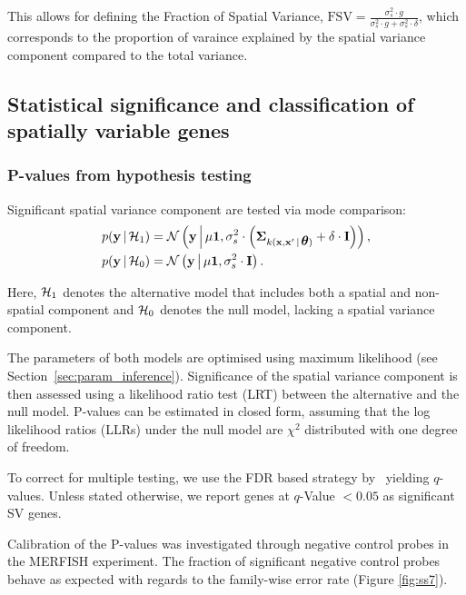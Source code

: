 This allows for defining the Fraction of Spatial Variance, $ \text{FSV} = \frac{\sigma^2_s \cdot g}{\sigma^2_s \cdot g + \sigma^2_s \cdot \delta} $, which corresponds to the proportion of varaince explained by the spatial variance component compared to the total variance.

\subsection{Statistical significance and classification of spatially variable genes}

\subsubsection*{P-values from hypothesis testing}

Significant spatial variance component are tested via mode comparison: 
\begin{align*}
    p({\bf y} \,|\, \mathcal{H}_1) &=  \mathcal{N}\left({\bf y} \,\middle | \, \mu {\bf 1}, \sigma_s^2 \cdot \left ( \mbox{\boldmath $\Sigma$}_{k({\bf x},{\bf x}'\,|\, \mbox{\boldmath $\theta$})} + \delta \cdot {\bf I} \right )\right), \\
    p({\bf y} \,|\, \mathcal{H}_0) &=  \mathcal{N}\left({\bf y} \,\middle | \, \mu {\bf 1},  \sigma_s^2 \cdot {\bf I}\right).
\end{align*}

Here, $\mathcal{H}_1$ denotes the alternative model that includes both a spatial and non-spatial component and $\mathcal{H}_0$ denotes the null model, lacking a spatial variance component.

The parameters of both models are optimised using maximum likelihood (see Section~\ref{sec:param_inference}).
Significance of the spatial variance component is then assessed using a likelihood ratio test (LRT) between the alternative and the null model. 
P-values can be estimated in closed form, assuming that the log likelihood ratios (LLRs) under the null model are \( \chi^2 \) distributed with one degree of freedom.

\begin{sloppypar}
To correct for multiple testing, we use the FDR based strategy by~\cite{Storey2003-ap} yielding \( q \)-values.  Unless stated otherwise, we report genes at \( q \)-Value \( < 0.05 \) as significant SV genes.
\end{sloppypar}

Calibration of the P-values was investigated through negative control probes in the MERFISH experiment. The fraction of significant negative control probes behave as expected with regards to the family-wise error rate (Figure \ref{fig:ss7}).

